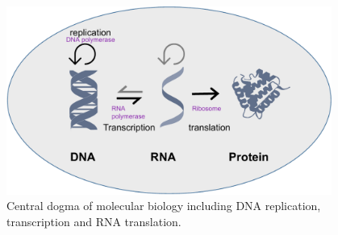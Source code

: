 \begin{figure}[!ht]
	\centering
	\includegraphics[width=0.95\textwidth]{central_dogma/fig}
	\vspace{0.1cm}
	\caption[central dogma.]{Central dogma of molecular biology including DNA replication, transcription and RNA translation.} 
	\label{fig:central_dogma}
\end{figure}



